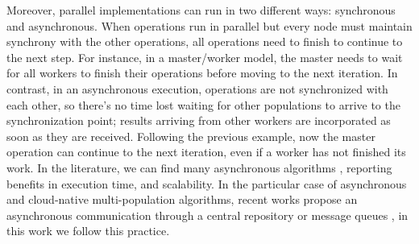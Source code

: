\documentclass[review]{elsarticle}
\begin{document}
Moreover, parallel implementations can run in two different ways: synchronous and
asynchronous. When operations run in parallel but every node must maintain synchrony with
the other operations,  all operations need to finish to continue to the next
step. For instance, in a  master/worker model, the master needs to wait for all
workers to finish their operations before moving to the next iteration.  In
contrast, in an asynchronous execution,  operations are not synchronized with
each other, so there's no time lost waiting for other populations to
arrive to the synchronization point; results arriving from other workers are 
incorporated as soon as they are received. Following the previous example, now the master operation can
continue to the next iteration, even if a worker has not finished its work.  In
the literature, we can find many asynchronous algorithms
\cite{coleman89,baugh2003asynchronous}, reporting benefits in execution time,
and scalability. In the particular case of asynchronous and cloud-native
multi-population algorithms, recent works propose an asynchronous communication
through a central repository \cite{sofea:cec2012, JSON} or message queues
\cite{salza2019speed, guervos2018introducing}, in this work we follow this
practice.
\end{document}
